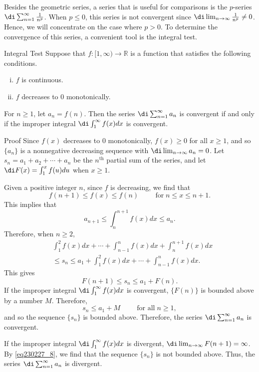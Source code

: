 Besides the geometric series, a series that is useful for comparisons is the $p$-series $\di\sum_{n=1}^{\infty}\frac{1}{n^p}$. When $p\leq 0$, this series is not convergent since $\di\lim_{n\to\infty}\frac{1}{n^p}\neq 0$. Hence, we will concentrate on the case where $p>0$. To determine the convergence of this series, a convenient tool is the integral test.
\begin{theorem}{Integral Test}
Suppose that $f:[1, \infty)\to\mathbb{R}$ is a function that satisfies the following conditions.
\begin{enumerate}[(i)]
\item $f$ is continuous.
\item $f$ decreases to 0 monotonically. 

\end{enumerate} For $n\geq 1$, let $a_n=f(n)$. Then the series $\di\sum_{n=1}^{\infty}a_n$ is convergent if and only if the improper integral $\di\int_1^{\infty}f(x)dx$ is convergent.
\end{theorem}
 

\begin{myproof}{Proof}
Since $f(x)$ decreases to 0 monotonically, $f(x)\geq 0$ for all $x\geq 1$,  and so $\{a_n\}$ is a nonnegative decreasing sequence with $\di\lim_{n\to\infty}a_n=0$.   Let $s_n=a_1+a_2+\cdots+a_n$ be the $n^{\text{th}}$ partial sum of the series, and let $\di F(x)=\int_1^x f(u)du$ when $x\geq 1$.\bp

Given a positive integer $n$, since $f$ is decreasing, we find that
\[f(n+1)\leq f(x)\leq f(n)\hspace{1cm}\text{for}\;n\leq x\leq n+1.\]
This implies that
\[a_{n+1}\leq\int_n^{n+1}f(x)dx\leq a_{n}.\]
Therefore, when $n\geq 2$,
\begin{align*}&\int_1^2f(x)dx+\cdots+\int_{n-1}^nf(x)dx+\int_{n}^{n+1}f(x)dx\\&\leq s_n\leq a_1+\int_1^2f(x)dx+\cdots+\int_{n-1}^nf(x)dx.\end{align*}
This gives
\begin{equation}\label{eq230227_8}F(n+1)\leq s_n\leq a_1+F(n).\end{equation}
If the improper integral $\di\int_1^{\infty}f(x)dx$ is convergent, $\{F(n)\}$ is bounded above by a number $M$. Therefore,
\[s_n\leq a_1+M\hspace{1cm}\text{for all}\;n\geq 1,\] and so the sequence $\{s_n\}$ is bounded above. Therefore, the series $\di\sum_{n=1}^{\infty}a_n$ is convergent.

If the improper integral $\di\int_1^{\infty}f(x)dx$  is divergent,  $\di\lim_{n\to\infty}F(n+1)=\infty$. By \eqref{eq230227_8},  we find  that  the sequence $\{s_n\}$ is not bounded above. Thus, the series $\di\sum_{n=1}^{\infty}a_n$ is divergent.
\end{myproof}

